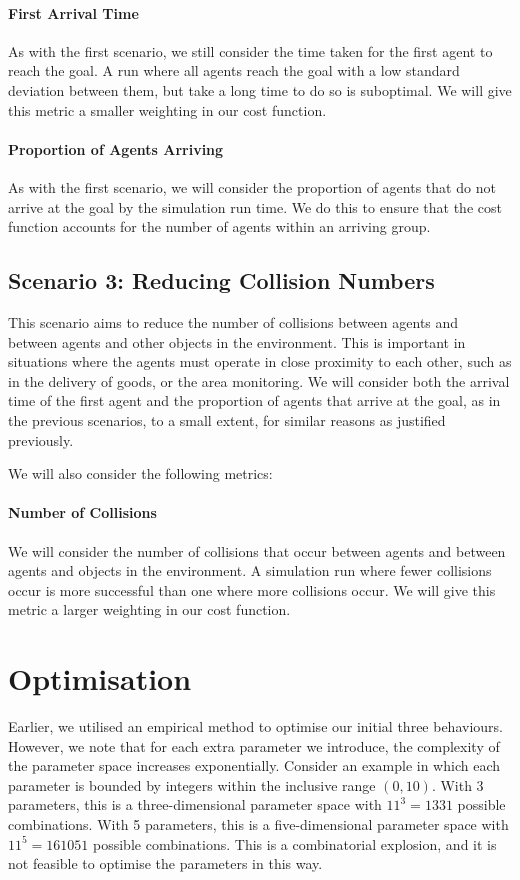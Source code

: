 \documentclass[12pt]{article}
\begin{document}
\paragraph{First Arrival Time} As with the first scenario, we still consider the time taken for the first agent to reach the goal. A run where all agents reach the goal with a low standard deviation between them, but take a long time to do so is suboptimal. We will give this metric a smaller weighting in our cost function.

\paragraph{Proportion of Agents Arriving} As with the first scenario, we will consider the proportion of agents that do not arrive at the goal by the simulation run time. We do this to ensure that the cost function accounts for the number of agents within an arriving group.

\subsection{Scenario 3: Reducing Collision Numbers}
This scenario aims to reduce the number of collisions between agents and between agents and other objects in the environment. This is important in situations where the agents must operate in close proximity to each other, such as in the delivery of goods, or the area monitoring. We will consider both the arrival time of the first agent and the proportion of agents that arrive at the goal, as in the previous scenarios, to a small extent, for similar reasons as justified previously.

We will also consider the following metrics: 

\paragraph{Number of Collisions} We will consider the number of collisions that occur between agents and between agents and objects in the environment. A simulation run where fewer collisions occur is more successful than one where more collisions occur. We will give this metric a larger weighting in our cost function.

\newpage
\section{Optimisation}
Earlier, we utilised an empirical method to optimise our initial three behaviours. However, we note that for each extra parameter we introduce, the complexity of the parameter space increases exponentially. Consider an example in which each parameter is bounded by integers within the inclusive range $(0,10)$. With 3 parameters, this is a three-dimensional parameter space with $11^3 = 1331$ possible combinations. With 5 parameters, this is a five-dimensional parameter space with $11^5 = 161051$ possible combinations. This is a combinatorial explosion, and it is not feasible to optimise the parameters in this way.
\end{document}
